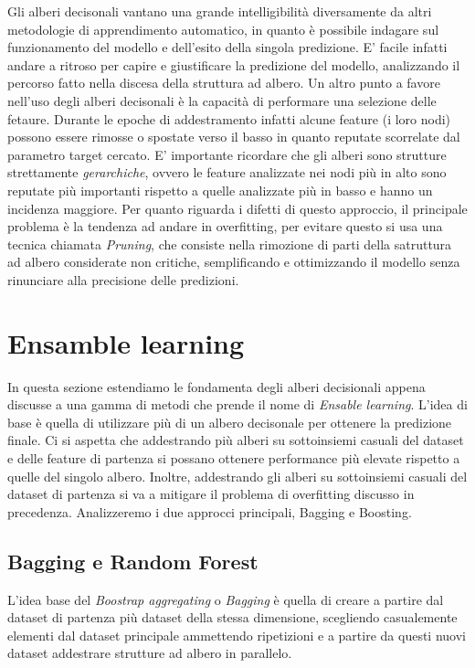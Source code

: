 \documentclass[12pt,a4paper,openright,twoside]{report}
\begin{document}
Gli alberi decisonali vantano una grande intelligibilità diversamente da altri metodologie di apprendimento automatico, in quanto è possibile indagare sul funzionamento del modello e dell'esito della singola predizione. E' facile infatti andare a ritroso per capire e giustificare la predizione del modello, analizzando il percorso fatto nella discesa della struttura ad albero. 
Un altro punto a favore nell'uso degli alberi decisonali è la capacità di performare una selezione delle fetaure. Durante le epoche di addestramento infatti alcune feature (i loro nodi) possono essere rimosse o spostate verso il basso in quanto reputate scorrelate dal parametro target cercato. 
E' importante ricordare che gli alberi sono strutture strettamente \emph{gerarchiche}, ovvero le feature analizzate nei nodi più in alto sono reputate più importanti rispetto a quelle analizzate più in basso e hanno un incidenza maggiore.
Per quanto riguarda i difetti di questo approccio, il principale problema è la tendenza ad andare in overfitting, per evitare questo si usa una tecnica chiamata \emph{Pruning}, che consiste nella rimozione di parti della satruttura ad albero considerate non critiche, semplificando e ottimizzando il modello senza rinunciare alla precisione delle predizioni. 
\section{Ensamble learning}
In questa sezione estendiamo le fondamenta degli alberi decisionali appena discusse a una gamma di metodi che prende il nome di \emph{Ensable learning}.
L'idea di base è quella di utilizzare più di un albero decisonale per ottenere la predizione finale. Ci si aspetta che addestrando più alberi su sottoinsiemi casuali del dataset e delle feature di partenza si possano ottenere performance più elevate rispetto a quelle del singolo albero. Inoltre, addestrando gli alberi su sottoinsiemi casuali del dataset di partenza si va a mitigare il problema di overfitting discusso in precedenza.
Analizzeremo i due approcci principali, Bagging e Boosting.
\subsection{Bagging e Random Forest}
L'idea base del \emph{Boostrap aggregating} o \emph{Bagging} è quella di creare a partire dal dataset di partenza più dataset della stessa dimensione, scegliendo casualemente elementi dal dataset principale ammettendo ripetizioni e a partire da questi nuovi dataset addestrare strutture ad albero in parallelo. 
\end{document}
